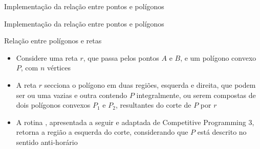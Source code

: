 \begin{frame}[fragile]{Implementação da relação entre pontos e polígonos}
\end{frame}

\begin{frame}[fragile]{Implementação da relação entre pontos e polígonos}
\end{frame}

\begin{frame}[fragile]{Relação entre polígonos e retas}

    \begin{itemize}
        \item Considere uma reta $r$, que passa pelos pontos $A$ e $B$, e um polígono convexo $P$, 
            com $n$ vértices
        \pause

        \item A reta $r$ secciona o polígono em duas regiões, esquerda e direita, que podem ser ou 
            uma vazias e outra contendo $P$ integralmente, ou serem compostas de dois polígonos 
            convexos $P_1$ e $P_2$, resultantes do corte de $P$ por $r$
        \pause

        \item A rotina , apresentada a seguir e adaptada de Competitive 
            Programming 3, retorna a região a esquerda do corte, considerando que $P$ está descrito 
            no sentido anti-horário
    \end{itemize}
        \pause

    \begin{figure}
        \centering

    \end{figure}

\end{frame}

